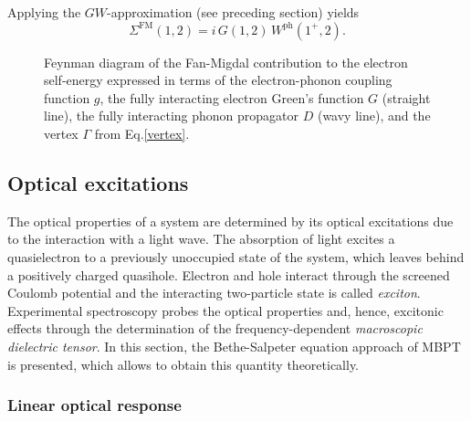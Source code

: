 %
Applying the $GW$-approximation (see preceding section) yields
%
\begin{equation}\label{gwph} 
         \Sigma^\text{FM}(1,2) = i\,G(1,2)\,W^\text{ph}(1^+,2).
\end{equation}
\begin{figure}[t]
\centering
{}
\caption[Feynman diagram of the Fan-Migdal contribution to the electron self-energy.]{Feynman diagram of the Fan-Migdal contribution to the electron self-energy expressed in terms of the electron-phonon
coupling function $g$, the fully
interacting electron Green’s function $G$ (straight line), the
fully interacting phonon propagator $D$  (wavy line), and the
vertex $\Gamma$ from Eq.\;\eqref{vertex}.\label{fm_self_en}}
\end{figure}
%



\subsection{Optical excitations}
The optical properties of a system are determined by its optical excitations due to the interaction with a light wave. The absorption of light excites a quasielectron to a previously unoccupied state of the system, which leaves behind a positively charged quasihole. Electron and hole interact through the screened Coulomb potential and the interacting two-particle state is called \textit{exciton}. Experimental spectroscopy probes the optical properties and, hence, excitonic effects through the determination of the frequency-dependent \textit{macroscopic dielectric tensor}. In this section, the Bethe-Salpeter equation approach of MBPT is presented, which allows to obtain this quantity theoretically.
\vfill

\subsubsection{Linear optical response}\label{subsec_lin_response}


